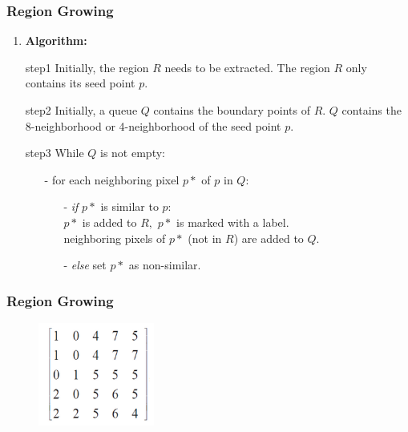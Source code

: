 \documentclass[notheorems,mathserif,table,compress]{beamer}  %
\begin{document}
\begin{frame}
    \frametitle{Region Growing}
    \begin{enumerate}[{\color{black}{\Large (B)}}]
    \item  \textbf{\Large Algorithm:}
    \end{enumerate}
    \begin{itemize}
    \item[step1] Initially, the region $R$ needs to be extracted. The region $R$ only contains its seed point $p.$
    \item[step2] Initially, a queue $Q$ contains the boundary points of $R.$ $Q$ contains the 8-neighborhood or 4-neighborhood of the seed point $p$.
    \item[step3] While $Q$ is not empty:
    	\begin{itemize}
	\item[-] for each neighboring pixel $p*$ of $p$ in $Q:$
	     \begin{itemize}
	     \item[-] \emph{if}  $p*$ is similar to $p:$\\
	        \hspace{0.1in} {\color{blue}{-}} \hspace{0.05in} $p*$ is added to $R,$ $p*$ is marked with a label.\\
        	\hspace{0.1in} {\color{blue}{-}} \hspace{0.05in} neighboring pixels of $p*$ (not in $R$) are added to $Q.$
	     \item[-] \emph{else} set $p*$ as non-similar.
	     \end{itemize}
	\end{itemize}
    \end{itemize}
\end{frame}

\begin{frame}
  \frametitle{Region Growing}
  \begin{figure}[!ht]
  \centering\includegraphics[width=1.5in]{grow_algorithm.png}
  \end{figure} 
\end{frame}
\end{document}
